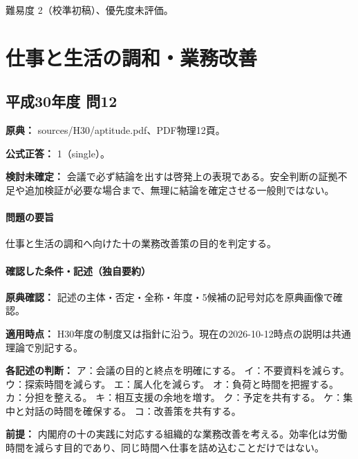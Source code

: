 \par 難易度 2（校準初稿）、優先度未評価。

\section{仕事と生活の調和・業務改善}

\subsection{平成30年度 問12}
\label{q:h30-reg-apt-12}

\noindent\textbf{原典：} sources/H30/aptitude.pdf、PDF物理12頁。

\textbf{公式正答：} 1（single）。

\par\textbf{検討未確定：} 会議で必ず結論を出すは啓発上の表現である。安全判断の証拠不足や追加検証が必要な場合まで、無理に結論を確定させる一般則ではない。

\paragraph{問題の要旨} 仕事と生活の調和へ向けた十の業務改善策の目的を判定する。

\paragraph{確認した条件・記述（独自要約）}\mbox{}\par

\noindent\textbf{原典確認：} 記述の主体・否定・全称・年度・5候補の記号対応を原典画像で確認。\par

\noindent\textbf{適用時点：} H30年度の制度又は指針に沿う。現在の2026-10-12時点の説明は共通理論で別記する。\par

\noindent\textbf{各記述の判断：} ア：会議の目的と終点を明確にする。 イ：不要資料を減らす。 ウ：探索時間を減らす。 エ：属人化を減らす。 オ：負荷と時間を把握する。 カ：分担を整える。 キ：相互支援の余地を増す。 ク：予定を共有する。 ケ：集中と対話の時間を確保する。 コ：改善策を共有する。\par

\noindent\textbf{前提：} 内閣府の十の実践に対応する組織的な業務改善を考える。効率化は労働時間を減らす目的であり、同じ時間へ仕事を詰め込むことだけではない。\par

